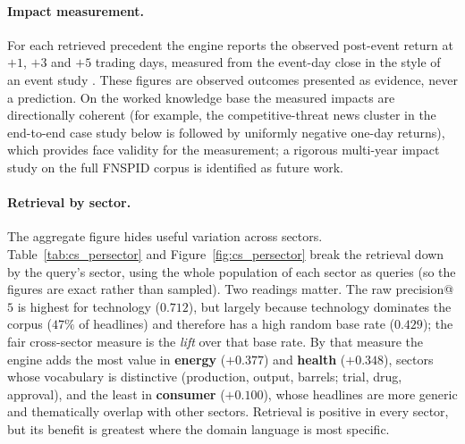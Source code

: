 \paragraph{Impact measurement.}
For each retrieved precedent the engine reports the observed post-event return at $+1$, $+3$ and $+5$
trading days, measured from the event-day close in the style of an event study \autocite{brown1985daily}.
These figures are observed outcomes presented as evidence, never a prediction. On the worked knowledge
base the measured impacts are directionally coherent (for example, the competitive-threat news cluster
in the end-to-end case study below is followed by uniformly negative one-day returns), which provides
face validity for the measurement; a rigorous multi-year impact study on the full FNSPID corpus is
identified as future work.

\paragraph{Retrieval by sector.}
The aggregate figure hides useful variation across sectors. Table~\ref{tab:cs_persector} and
Figure~\ref{fig:cs_persector} break the retrieval down by the query's sector, using the whole population
of each sector as queries (so the figures are exact rather than sampled). Two readings matter. The raw
precision@$5$ is highest for technology ($0.712$), but largely because technology dominates the corpus
($47\%$ of headlines) and therefore has a high random base rate ($0.429$); the fair cross-sector measure
is the \emph{lift} over that base rate. By that measure the engine adds the most value in
\textbf{energy} ($+0.377$) and \textbf{health} ($+0.348$), sectors whose vocabulary is distinctive
(production, output, barrels; trial, drug, approval), and the least in \textbf{consumer} ($+0.100$),
whose headlines are more generic and thematically overlap with other sectors. Retrieval is positive in
every sector, but its benefit is greatest where the domain language is most specific.

